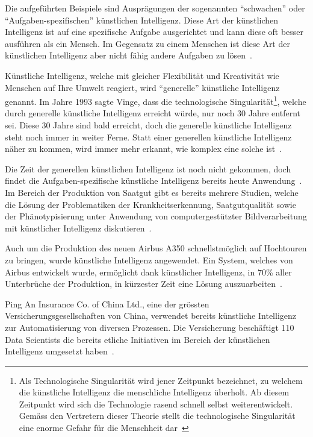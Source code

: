 Die aufgeführten Beispiele sind Ausprägungen der sogenannten \enquote{schwachen} oder \enquote{Aufgaben-spezifischen} künstlichen Intelligenz. Diese Art der künstlichen Intelligenz ist auf eine spezifische Aufgabe ausgerichtet und kann diese oft besser ausführen als ein Mensch. Im Gegensatz zu einem Menschen ist diese Art der künstlichen Intelligenz aber nicht fähig andere Aufgaben zu lösen~\autocite{Lu2018}.

Künstliche Intelligenz, welche mit gleicher Flexibilität und Kreativität wie Menschen auf Ihre Umwelt reagiert, wird \enquote{generelle} künstliche Intelligenz genannt. Im Jahre 1993 sagte Vinge, dass die technologische Singularität\footnote{Als Technologische Singularität wird jener Zeitpunkt bezeichnet, zu welchem die künstliche Intelligenz die menschliche Intelligenz überholt. Ab diesem Zeitpunkt wird sich die Technologie rasend schnell selbst weiterentwickelt. Gemäss den Vertretern dieser Theorie stellt die technologische Singularität eine enorme Gefahr für die Menschheit dar~\autocite{Tredinnick2017}}, welche durch generelle künstliche Intelligenz erreicht würde, nur noch 30 Jahre entfernt sei. Diese 30 Jahre sind bald erreicht, doch die generelle künstliche Intelligenz steht noch immer in weiter Ferne. Statt einer generellen künstliche Intelligenz näher zu kommen, wird immer mehr erkannt, wie komplex eine solche ist~\autocite{Tredinnick2017}.

Die Zeit der generellen künstlichen Intelligenz ist noch nicht gekommen, doch findet die Aufgaben-spezifische künstliche Intelligenz bereits heute Anwendung~\autocite{Tredinnick2017}. Im Bereich der Produktion von Saatgut gibt es bereits mehrere Studien, welche die Lösung der Problematiken der Krankheitserkennung, Saatgutqualität sowie der Phänotypisierung unter Anwendung von computergestützter Bildverarbeitung mit künstlicher Intelligenz diskutieren~\autocite{Patricio2018}. 

Auch um die Produktion des neuen Airbus A350 schnellstmöglich auf Hochtouren zu bringen, wurde künstliche Intelligenz angewendet. Ein System, welches von Airbus entwickelt wurde, ermöglicht dank künstlicher Intelligenz, in 70\% aller Unterbrüche der Produktion, in kürzester Zeit eine Lösung auszuarbeiten~\autocite{Ransbotham2017}.

Ping An Insurance Co. of China Ltd., eine der grössten Versicherungsgesellschaften von China, verwendet bereits künstliche Intelligenz zur Automatisierung von diversen Prozessen. Die Versicherung beschäftigt 110 Data Scientists die bereits etliche Initiativen im Bereich der künstlichen Intelligenz umgesetzt haben~\autocite{Ransbotham2017}.

